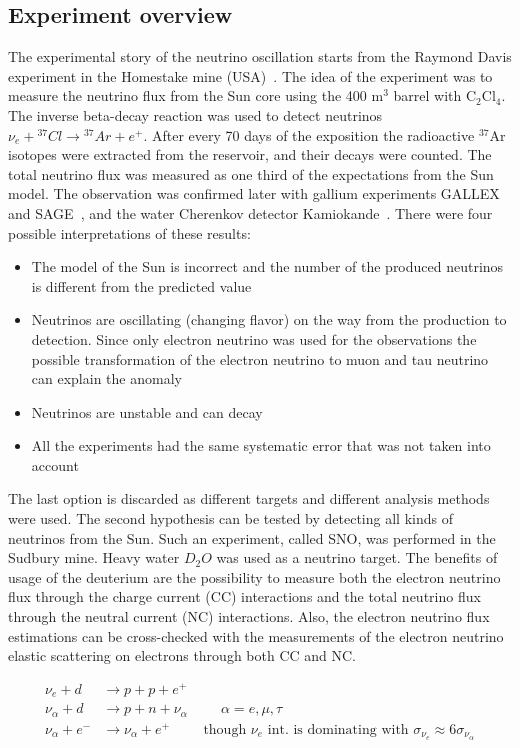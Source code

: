 \documentclass[../main.tex]{subfiles}
\begin{document}
\subsection{Experiment overview}
\label{sec:intro:osc_exp}
The experimental story of the neutrino oscillation starts from the Raymond Davis experiment in the Homestake mine (USA)~\cite{Davis1968}. The idea of the experiment was to measure the neutrino flux from the Sun core using the 400 $\text{m}^3$ barrel with ${\text{C}_2\text{Cl}_4}$. The inverse beta-decay reaction was used to detect neutrinos $\nu_e+{}^{37}Cl\to{}^{37}Ar+e^+$. After every 70 days of the exposition the radioactive ${}^{37}\text{Ar}$ isotopes were extracted from the reservoir, and their decays were counted. The total neutrino flux was measured as one third of the expectations from the Sun model. The observation was confirmed later with gallium experiments GALLEX~\cite{Kirsten1999} and SAGE~\cite{Abdurashitov1999}, and the water Cherenkov detector Kamiokande~\cite{Oyama1989}. There were four possible interpretations of these results:
\begin{itemize}
  \item The model of the Sun is incorrect and the number of the produced neutrinos is different from the predicted value
  \item Neutrinos are oscillating (changing flavor) on the way from the production to detection. Since only electron neutrino was used for the observations the possible transformation of the electron neutrino to muon and tau neutrino can explain the anomaly
  \item Neutrinos are unstable and can decay
  \item All the experiments had the same systematic error that was not taken into account
\end{itemize}
The last option is discarded as different targets and different analysis methods were used. The second hypothesis can be tested by detecting all kinds of neutrinos from the Sun. Such an experiment, called SNO, was performed in the Sudbury mine. Heavy water $D_2O$ was used as a neutrino target. The benefits of usage of the deuterium are the possibility to measure both the electron neutrino flux through the charge current (CC) interactions and the total neutrino flux through the neutral current (NC) interactions. Also, the electron neutrino flux estimations can be cross-checked with the measurements of the electron neutrino elastic scattering on electrons through both CC and NC.

\begin{align}
\nu_e+d&\to p+p+e^+ \\
\nu_\alpha+d&\to p+n+\nu_\alpha\hspace{1cm} \alpha =e,\mu,\tau \\
\nu_\alpha+e^-&\to\nu_\alpha+e^+ \hspace{1cm} \text{though } \nu_e \text{ int. is dominating with } \sigma_{\nu_e}\approx6\sigma_{\nu_\alpha}
\end{align}
\end{document}

